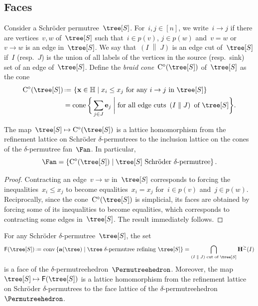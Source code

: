 \documentclass[ALCO]{cedram}
\newcommand{\HH}{\mathbb{H}} %
\renewcommand{\b}[1]{\mathbf{#1}} %
\newcommand{\set}[2]{\left\{ #1 \;\middle|\; #2 \right\}} %
\newcommand{\biggset}[2]{\bigg\{ #1 \;\bigg|\; #2 \bigg\}} %
\newcommand{\eqdef}{\mbox{\,\raisebox{0.2ex}{\scriptsize\ensuremath{\mathrm:}}\ensuremath{=}\,}} %
\newcommand{\polar}{^\diamond} %
\newcommand{\decoration}{\delta} %
\newcommand{\edgecut}[2]{\left( #1 \;\middle\|\; #2 \right)} %
\newcommand{\Cone}{\mathrm{C}} %
\newcommand{\HS}{\b{H}^\ge} %
\newcommand{\face}{\mathsf{F}} %
\DeclareMathOperator{\conv}{conv} %
\DeclareMathOperator{\cone}{cone} %
\newcommand{\darkblue}{\color{darkblue}} %
\newcommand{\defn}[1]{\emph{\darkblue #1}} %
\begin{document}

\subsection{Faces}
\label{subsec:faces}

Consider a Schr\"oder permutree~$\tree[S]$. For~$i,j \in [n]$, we write~$i \to j$ if there are vertices~$v,w$ of~$\tree[S]$ such that~$i \in p(v)$, $j \in p(w)$ and~$v = w$ or~$v \to w$ is an edge in~$\tree[S]$. We say that~$\edgecut{I}{J}$ is an edge cut of~$\tree[S]$ if~$I$ (resp.~$J$) is the union of all labels of the vertices in the source (resp.~sink) set of an edge of~$\tree[S]$. Define the \defn{braid cone}~$\Cone\polar(\tree[S])$ of~$\tree[S]$ as the cone
\begin{align*}
\Cone\polar(\tree[S])
& \eqdef \set{\b{x} \in \HH}{x_i \le x_j \text{ for any } i \to j \text{ in } \tree[S]} \\
& = \cone \biggset{\sum_{j \in J} \b{e}_j}{\text{for all edge cuts } \edgecut{I}{J} \text{ of } \tree[S]}.
\end{align*}

\begin{proposition}
\label{prop:fan}
The map~$\tree[S] \mapsto \Cone\polar(\tree[S])$ is a lattice homomorphism from the refinement lattice on Schr\"oder $\decoration$-permutrees to the inclusion lattice on the cones of the $\decoration$-permutree fan~$\Fan$. In particular,
\[
\Fan = \set{\Cone\polar(\tree[S])}{\tree[S] \text{ Schr\"oder $\decoration$-permutree}}.
\]
\end{proposition}

\begin{proof}
Contracting an edge~$v \to w$ in~$\tree[S]$ corresponds to forcing the inequalities~$x_i \le x_j$ to become equalities~$x_i = x_j$ for~$i \in p(v)$ and~$j \in p(w)$. Reciprocally, since the cone~$\Cone\polar(\tree[S])$ is simplicial, its faces are obtained by forcing some of its inequalities to become equalities, which corresponds to contracting some edges in~$\tree[S]$. The result immediately follows.
\end{proof}

\begin{proposition}
For any Schr\"oder $\decoration$-permutree~$\tree[S]$, the set
\[
\face(\tree[S]) \eqdef \conv\set{\b{a}(\tree)}{\tree \; \decoration\text{-permutree refining } \tree[S]}= \bigcap_{\edgecut{I}{J} \text{ cut of } \tree[S]} \HS(I)
\]
is a face of the $\decoration$-permutreehedron~$\Permutreehedron$. Moreover, the map~$\tree[S] \mapsto \face(\tree[S])$ is a lattice homomorphism from the refinement lattice on Schr\"oder $\decoration$-permutrees to the face lattice of the $\decoration$-permutreehedron~$\Permutreehedron$.
\end{proposition}
\end{document}
